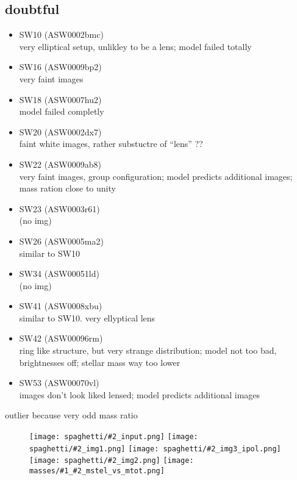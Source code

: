 \documentclass[a4paper,fleqn,usenatbib]{mnras}
\newcommand{\inclfig}[2]{
  \texttt{[image: spaghetti/\#2\_input.png]}
  \texttt{[image: spaghetti/\#2\_img1.png]}
  \texttt{[image: spaghetti/\#2\_img3\_ipol.png]}
  \texttt{[image: spaghetti/\#2\_img2.png]}
  \texttt{[image: masses/\#1\_\#2\_mstel\_vs\_mtot.png]}
}
\begin{document}
\subsection{doubtful}
\begin{itemize}
  \item SW10 (ASW0002bmc) \\
  very elliptical setup, unlikley to be a lens;
  model failed totally
  
  \item SW16 (ASW0009bp2) \\
  very faint images
  
  \item SW18 (ASW0007hu2) \\
  model failed completly
  
  \item SW20 (ASW0002dx7) \\
  faint white images, rather substuctre of ``lens'' ??
  
  \item SW22 (ASW0009ab8) \\
  very faint images, group configuration;
  model predicts additional images;
  mass ration close to unity
  
  \item SW23 (ASW0003r61) \\
  (no img)
  
  \item SW26 (ASW0005ma2) \\
  similar to SW10
  
  \item SW34 (ASW00051ld) \\
  (no img)
  
  \item SW41 (ASW0008xbu) \\
  similar to SW10. very ellyptical lens
  
  \item SW42 (ASW00096rm) \\
  ring like structure, but very strange distribution;
  model not too bad, brightnesses off;
  stellar mass way too lower
  
  \item SW53 (ASW00070vl) \\
  images don't look liked lensed;
  model predicts additional images
  
\end{itemize}



outlier because very odd mass ratio
\begin{figure}
	\inclfig{SW42}{ASW00096rm_4Q3YCEWGLN}
\end{figure}
\end{document}
